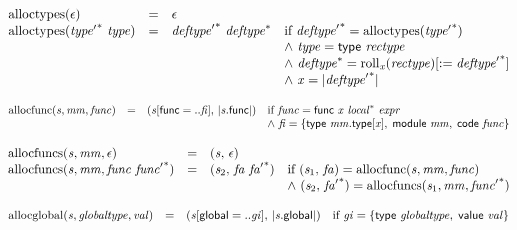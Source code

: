 $$
\begin{array}{@{}lcl@{}l@{}}
{\mathrm{alloctypes}}(\epsilon) &=& \epsilon &  \\
{\mathrm{alloctypes}}({{\mathit{type}'}^\ast}~{\mathit{type}}) &=& {{\mathit{deftype}'}^\ast}~{{\mathit{deftype}}^\ast} &\quad
  \mbox{if}~{{\mathit{deftype}'}^\ast} = {\mathrm{alloctypes}}({{\mathit{type}'}^\ast}) \\
 &&&\quad {\land}~{\mathit{type}} = \mathsf{type}~{\mathit{rectype}} \\
 &&&\quad {\land}~{{\mathit{deftype}}^\ast} = {{{\mathrm{roll}}}_{{\mathit{x}}}({\mathit{rectype}})}{[{ := }\;{{\mathit{deftype}'}^\ast}]} \\
 &&&\quad {\land}~{\mathit{x}} = {|{{\mathit{deftype}'}^\ast}|} \\
\end{array}
$$

$$
\begin{array}{@{}lcl@{}l@{}}
{\mathrm{allocfunc}}({\mathit{s}}, {\mathit{mm}}, {\mathit{func}}) &=& ({\mathit{s}}[\mathsf{func} = ..{\mathit{fi}}],\, {|{\mathit{s}}.\mathsf{func}|}) &\quad
  \mbox{if}~{\mathit{func}} = \mathsf{func}~{\mathit{x}}~{{\mathit{local}}^\ast}~{\mathit{expr}} \\
 &&&\quad {\land}~{\mathit{fi}} = \{ \begin{array}[t]{@{}l@{}}
\mathsf{type}~{\mathit{mm}}.\mathsf{type}[{\mathit{x}}],\; \mathsf{module}~{\mathit{mm}},\; \mathsf{code}~{\mathit{func}} \}\end{array} \\
\end{array}
$$

$$
\begin{array}{@{}lcl@{}l@{}}
{\mathrm{allocfuncs}}({\mathit{s}}, {\mathit{mm}}, \epsilon) &=& ({\mathit{s}},\, \epsilon) &  \\
{\mathrm{allocfuncs}}({\mathit{s}}, {\mathit{mm}}, {\mathit{func}}~{{\mathit{func}'}^\ast}) &=& ({\mathit{s}}_{{2}},\, {\mathit{fa}}~{{\mathit{fa}'}^\ast}) &\quad
  \mbox{if}~({\mathit{s}}_{{1}},\, {\mathit{fa}}) = {\mathrm{allocfunc}}({\mathit{s}}, {\mathit{mm}}, {\mathit{func}}) \\
 &&&\quad {\land}~({\mathit{s}}_{{2}},\, {{\mathit{fa}'}^\ast}) = {\mathrm{allocfuncs}}({\mathit{s}}_{{1}}, {\mathit{mm}}, {{\mathit{func}'}^\ast}) \\
\end{array}
$$

$$
\begin{array}{@{}lcl@{}l@{}}
{\mathrm{allocglobal}}({\mathit{s}}, {\mathit{globaltype}}, {\mathit{val}}) &=& ({\mathit{s}}[\mathsf{global} = ..{\mathit{gi}}],\, {|{\mathit{s}}.\mathsf{global}|}) &\quad
  \mbox{if}~{\mathit{gi}} = \{ \begin{array}[t]{@{}l@{}}
\mathsf{type}~{\mathit{globaltype}},\; \mathsf{value}~{\mathit{val}} \}\end{array} \\
\end{array}
$$


